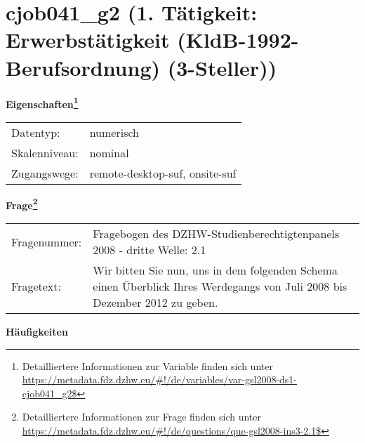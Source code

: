 
    \setcounter{footnote}{0}

    \vspace*{-1.8cm}
	\section{cjob041\_g2 (1. Tätigkeit: Erwerbstätigkeit (KldB-1992-Berufsordnung) (3-Steller))}
	\label{section:cjob041_g2}



    \vspace*{0.5cm}
    \noindent\textbf{Eigenschaften\footnote{Detailliertere Informationen zur Variable finden sich unter
		\url{https://metadata.fdz.dzhw.eu/\#!/de/variables/var-gsl2008-ds1-cjob041_g2$}}}\\
	\begin{tabularx}{\hsize}{@{}lX}
	Datentyp: & numerisch \\
	Skalenniveau: & nominal \\
	Zugangswege: &
	  remote-desktop-suf, 
	  onsite-suf
 \\
    \end{tabularx}



				\vspace*{0.5cm}
                \noindent\textbf{Frage\footnote{Detailliertere Informationen zur Frage finden sich unter
		              \url{https://metadata.fdz.dzhw.eu/\#!/de/questions/que-gsl2008-ins3-2.1$}}}\\
				\begin{tabularx}{\hsize}{@{}lX}
					Fragenummer: &
					  Fragebogen des DZHW-Studienberechtigtenpanels 2008 - dritte Welle:
					  2.1
 \\
					Fragetext: & Wir bitten Sie nun, uns in dem folgenden Schema einen Überblick Ihres Werdegangs von Juli 2008 bis Dezember 2012 zu geben. \\
				\end{tabularx}





        		\vspace*{0.5cm}
                \noindent\textbf{Häufigkeiten}

